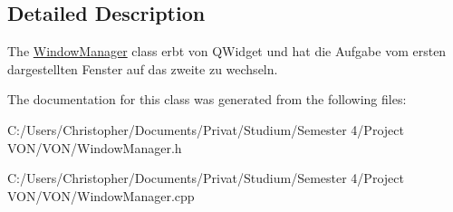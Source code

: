 \subsection{Detailed Description}
The \hyperlink{class_window_manager}{Window\+Manager} class erbt von Q\+Widget und hat die Aufgabe vom ersten dargestellten Fenster auf das zweite zu wechseln. 

The documentation for this class was generated from the following files\+:\begin{DoxyCompactItemize}
\item 
C\+:/\+Users/\+Christopher/\+Documents/\+Privat/\+Studium/\+Semester 4/\+Project V\+O\+N/\+V\+O\+N/Window\+Manager.\+h\item 
C\+:/\+Users/\+Christopher/\+Documents/\+Privat/\+Studium/\+Semester 4/\+Project V\+O\+N/\+V\+O\+N/Window\+Manager.\+cpp\end{DoxyCompactItemize}
